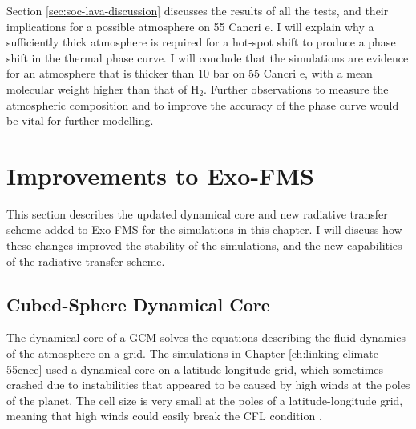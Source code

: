  Section \ref{sec:soc-lava-discussion} discusses the results of all the tests, and their implications for a possible atmosphere on 55 Cancri e. I will  explain why a sufficiently thick atmosphere is required for a hot-spot shift to produce a phase shift in the thermal phase curve. I will conclude that the simulations are evidence for an atmosphere that is thicker than 10 bar on 55 Cancri e, with a  mean molecular weight higher than that of H$_{2}$. Further observations to measure the atmospheric composition and to improve the accuracy of the phase curve would be vital for further modelling.
%
%



\section{Improvements to Exo-FMS}\label{sec:improved-gcm}

This section describes the updated dynamical core and new radiative transfer scheme added to Exo-FMS for the simulations in this chapter. I will discuss how these changes improved the stability of the simulations, and the new capabilities of the radiative transfer scheme.


\subsection{Cubed-Sphere Dynamical Core}

The dynamical core of a GCM solves the equations describing the fluid dynamics of the atmosphere on a grid. The simulations in Chapter \ref{ch:linking-climate-55cnce} used a dynamical core on a latitude-longitude grid, which sometimes crashed due to instabilities that appeared to be caused by high winds at the poles of the planet. The cell size is very small at the poles of a latitude-longitude grid, meaning that high winds could easily break the CFL condition \citep{courant1928partiellen}.

